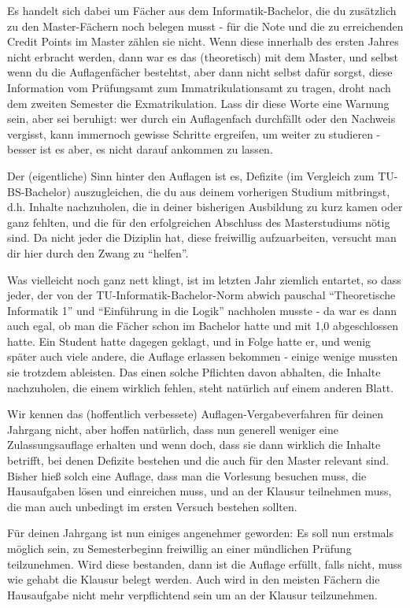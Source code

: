 Es handelt sich dabei um Fächer aus dem Informatik-Bachelor, die du zusätzlich zu den Master-Fächern noch belegen musst - für die Note und die zu erreichenden Credit Points im Master zählen sie nicht. Wenn diese innerhalb des ersten Jahres nicht erbracht werden, dann war es das (theoretisch) mit dem Master, und selbst wenn du die Auflagenfächer bestehtst, aber dann nicht selbst dafür sorgst, diese Information vom Prüfungsamt zum Immatrikulationsamt zu tragen, droht nach dem zweiten Semester die Exmatrikulation. Lass dir diese Worte eine Warnung sein, aber sei beruhigt: wer durch ein Auflagenfach durchfällt oder den Nachweis vergisst, kann immernoch gewisse Schritte ergreifen, um weiter zu studieren - besser ist es aber, es nicht darauf ankommen zu lassen.

Der (eigentliche) Sinn hinter den Auflagen ist es, Defizite (im Vergleich zum TU-BS-Bachelor) auszugleichen, die du aus deinem vorherigen Studium mitbringst, d.h. Inhalte nachzuholen, die in deiner bisherigen Ausbildung zu kurz kamen oder ganz fehlten, und die für den erfolgreichen Abschluss des Masterstudiums nötig sind. Da nicht jeder die Diziplin hat, diese freiwillig aufzuarbeiten, versucht man dir hier durch den Zwang zu "`helfen"'.

Was vielleicht noch ganz nett klingt, ist im letzten Jahr ziemlich entartet, so dass jeder, der von der TU-Informatik-Bachelor-Norm abwich pauschal "`Theoretische Informatik 1"' und "`Einführung in die Logik"' nachholen musste - da war es dann auch egal, ob man die Fächer schon im Bachelor hatte und mit 1,0 abgeschlossen hatte. Ein Student hatte dagegen geklagt, und in Folge hatte er, und wenig später auch viele andere, die Auflage erlassen bekommen - einige wenige mussten sie trotzdem ableisten. Das einen solche Pflichten davon abhalten, die Inhalte nachzuholen, die einem wirklich fehlen, steht natürlich auf einem anderen Blatt.

Wir kennen das (hoffentlich verbessete) Auflagen-Vergabeverfahren für deinen Jahrgang nicht, aber hoffen natürlich, dass nun generell weniger eine Zulassungsauflage erhalten und wenn doch, dass sie dann wirklich die Inhalte betrifft, bei denen Defizite bestehen und die auch für den Master relevant sind. Bisher hieß solch eine Auflage, dass man die Vorlesung besuchen muss, die Hausaufgaben lösen und einreichen muss, und an der Klausur teilnehmen muss, die man auch unbedingt im ersten Versuch bestehen sollten. 

Für deinen Jahrgang ist nun einiges angenehmer geworden: Es soll nun erstmals möglich sein, zu Semesterbeginn freiwillig an einer mündlichen Prüfung teilzunehmen. Wird diese bestanden, dann ist die Auflage erfüllt, falls nicht, muss wie gehabt die Klausur belegt werden. Auch wird in den meisten Fächern die Hausaufgabe nicht mehr verpflichtend sein um an der Klausur teilzunehmen.

